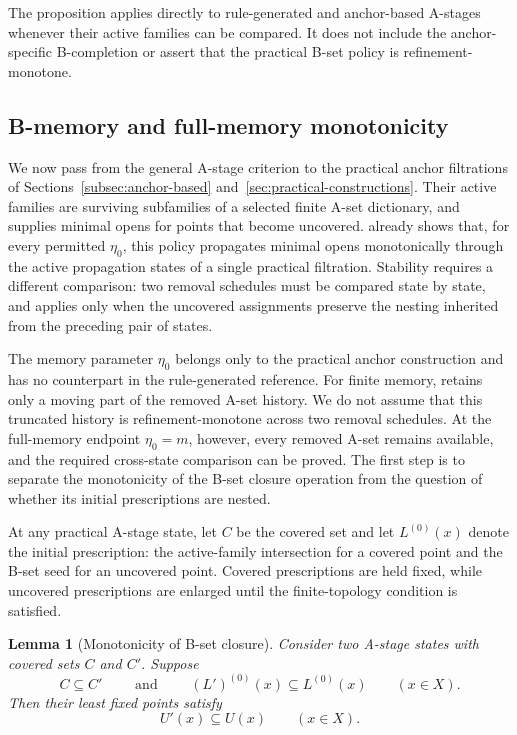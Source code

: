 \documentclass[a4paper,11pt]{article}
\newtheorem{lemma}[lemma]{Lemma}
\theoremstyle{definition}
\theoremstyle{remark}
\begin{document}
The proposition applies directly to rule-generated and anchor-based A-stages whenever their active families can be compared. It does not include the anchor-specific B-completion or assert that the practical B-set policy is refinement-monotone. 

\subsection{B-memory and full-memory monotonicity}
\label{subsec:eta-refinement-memory}

We now pass from the general A-stage criterion to the practical anchor filtrations of Sections~\ref{subsec:anchor-based} and~\ref{sec:practical-constructions}. Their active families are surviving subfamilies of a selected finite A-set dictionary, and  supplies minimal opens for points that become uncovered.  already shows that, for every permitted $\eta_0$, this policy propagates minimal opens monotonically through the active propagation states of a single practical filtration. Stability requires a different comparison: two removal schedules must be compared state by state, and  applies only when the uncovered assignments preserve the nesting inherited from the preceding pair of states.

The memory parameter $\eta_0$ belongs only to the practical anchor construction and has no counterpart in the rule-generated reference. For finite memory,  retains only a moving part of the removed A-set history. We do not assume that this truncated history is refinement-monotone across two removal schedules. At the full-memory endpoint $\eta_0=m$, however, every removed A-set remains available, and the required cross-state comparison can be proved. The first step is to separate the monotonicity of the B-set closure operation from the question of whether its initial prescriptions are nested.

At any practical A-stage state, let $C$ be the covered set and let $L^{(0)}(x)$ denote the initial prescription: the active-family intersection for a covered point and the B-set seed for an uncovered point. Covered prescriptions are held fixed, while uncovered prescriptions are enlarged until the finite-topology condition is satisfied.

\begin{lemma}[Monotonicity of B-set closure]
\label{lem:b-seed-monotonicity}
Consider two A-stage states with covered sets $C$ and $C'$. Suppose
$$
C\subseteq C'\qquad \text{ and }\qquad (L')^{(0)}(x)\subseteq L^{(0)}(x)\qquad(x\in X).
$$
Then their least fixed points satisfy
$$
U'(x)\subseteq U(x)
\qquad(x\in X).
$$
\end{lemma}
\end{document}
